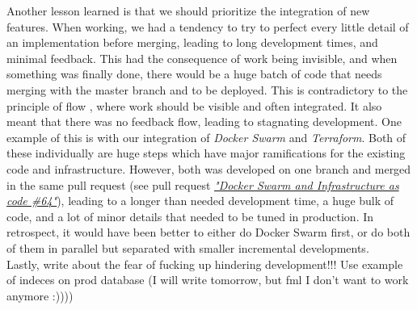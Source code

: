 \documentclass[11pt]{article}
\begin{document}
Another lesson learned is that we should prioritize the integration of new features. When working, we had a tendency to try to perfect every little detail of an implementation before merging, leading to long development times, and minimal feedback. This had the consequence of work being invisible, and when something was finally done, there would be a huge batch of code that needs merging with the master branch and to be deployed. This is contradictory to the principle of flow \citep{devops_handbook}, where work should be visible and often integrated. It also meant that there was no feedback flow, leading to stagnating development. One example of this is with our integration of \textit{Docker Swarm} and \textit{Terraform}. Both of these individually are huge steps which have major ramifications for the existing code and infrastructure. However, both was developed on one branch and merged in the same pull request (see pull request \href{https://github.com/group-o-minitwit-2024/MiniTwit/pull/64}{\textit{"Docker Swarm and Infrastructure as code \#64"}}), leading to a longer than needed development time, a huge bulk of code, and a lot of minor details that needed to be tuned in production. In retrospect, it would have been better to either do Docker Swarm first, or do both of them in parallel but separated with smaller incremental developments. \\


Lastly, write about the fear of fucking up hindering development!!! Use example of indeces on prod database (I will write tomorrow, but fml I don't want to work anymore :))))




\end{document}
